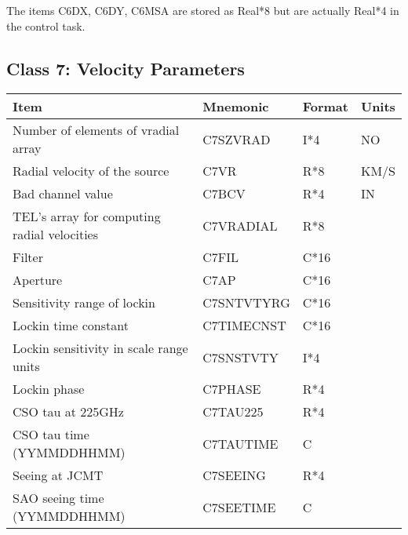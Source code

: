  The items C6DX, C6DY, C6MSA are stored as Real*8 
but are actually Real*4 in the control task.
                                                    
                           


\subsection{Class 7: Velocity Parameters}


\begin{tabular}{||l|l|l|l||} \hline
Item                                        & Mnemonic  & Format & Units \\ \hline
Number of elements of vradial array         & C7SZVRAD  & I*4    & NO    \\      
Radial velocity of the source               & C7VR      & R*8    & KM/S  \\      
Bad channel value                           & C7BCV     & R*4    & IN    \\      
TEL's array for computing radial velocities & C7VRADIAL & R*8    &  ~    \\      
Filter                                      & C7FIL     & C*16   &  ~    \\      
Aperture                                    & C7AP      & C*16   &  ~    \\      
Sensitivity range of lockin                 & C7SNTVTYRG& C*16   &  ~    \\      
Lockin time constant                        & C7TIMECNST& C*16   &  ~    \\      
Lockin sensitivity in scale range units     & C7SNSTVTY & I*4    &  ~    \\      
Lockin phase                                & C7PHASE   & R*4    &  ~    \\      
CSO tau at 225GHz                           & C7TAU225  & R*4    &  ~    \\      
CSO tau time (YYMMDDHHMM)                   & C7TAUTIME & C      &  ~    \\      
Seeing at JCMT                              & C7SEEING  & R*4    &  ~    \\      
SAO seeing time (YYMMDDHHMM)                & C7SEETIME & C      &  ~    \\  \hline
\end{tabular}
 \\

                            
                            
